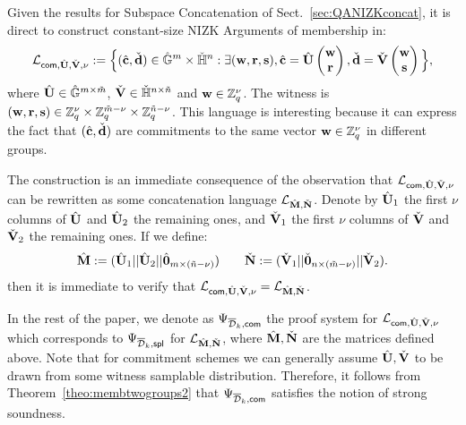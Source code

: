 
Given the results for Subspace Concatenation of 
Sect.~\ref{sec:QANIZKconcat}, it is direct to construct constant-size NIZK Arguments of membership in:
$$\mathcal{L}_{\mathsf{com},{\hat{\mathbf{{U}}}},\check{\mathbf{{V}}},\nu}:=\Big\{({\hat{\mathbf{c}}},\check{\mathbf{d}}) \in {\ensuremath{\hat{\mathbb{G}}}}^{m} \times {\ensuremath{\check{\mathbb{H}}}}^{n}:  \exists (\mathbf{w},\mathbf{r},\mathbf{s}),  
{\hat{\mathbf{c}}}= {\hat{\mathbf{{U}}}} \begin{pmatrix} \mathbf{w}\\ 
 \mathbf{r} \end{pmatrix}, \check{\mathbf{d}}=\check{\mathbf{{V}}} \begin{pmatrix} \mathbf{w} \\ \mathbf{s} \end{pmatrix}\Big\},$$
where ${\hat{\mathbf{{U}}}}\in {\ensuremath{\hat{\mathbb{G}}}}^{m \times \tilde{m}}$, 
$\check{\mathbf{{V}}} \in {\ensuremath{\check{\mathbb{H}}}}^{n \times \tilde{n}}$
and $\mathbf{w} \in \mathbb{Z}_q^{\nu}$. The witness is 
 $(\mathbf{w},\mathbf{r},\mathbf{s}) \in \mathbb{Z}_q^{\nu} \times \mathbb{Z}_q^{\tilde{m}-\nu} \times \mathbb{Z}_q^{\tilde{n}-\nu}$. This language is interesting because it can express the fact that 
$({\hat{\mathbf{c}}},\check{\mathbf{d}})$ are commitments to the same vector 
$\mathbf{w} \in \mathbb{Z}_q^{\nu}$ in different groups.
 
The construction is an immediate consequence of the observation 
that $\mathcal{L}_{\mathsf{com},{\hat{\mathbf{{U}}}},\check{\mathbf{{V}}},\nu}$  can be rewritten as some concatenation language $\mathcal{L}_{{\hat{\mathbf{{M}}}},\check{\mathbf{{N}}}}$.
Denote by ${\hat{\mathbf{{U}}}}_1$ the first $\nu$ columns of ${\hat{\mathbf{{U}}}}$  and ${\hat{\mathbf{{U}}}}_2$ the remaining ones, and $\check{\mathbf{{V}}}_1$ the first $\nu$ columns of $\check{\mathbf{{V}}}$ and $\check{\mathbf{{V}}}_2$ the remaining ones. If we define: 
\begin{equation*}
 {\hat{\mathbf{{M}}}} := ({\hat{\mathbf{{U}}}}_1||{\hat{\mathbf{{U}}}}_2||{\hat{\mathbf{{0}}}}_{m\times (\tilde{n}-\nu)}) \qquad
\check{\mathbf{{N}}} := (\check{\mathbf{{V}}}_1||\check{\mathbf{{0}}}_{n\times (\tilde{m}- \nu)}||\check{\mathbf{{V}}}_2).
\end{equation*}
then it is immediate to verify that $\mathcal{L}_{\mathsf{com},{\hat{\mathbf{{U}}}},\check{\mathbf{{V}}},\nu}=\mathcal{L}_{{\hat{\mathbf{{M}}}},\check{\mathbf{{N}}}}$.

In the rest of the paper, we denote as $\Psi_{\overline{\mathcal{D}}_k,\mathsf{com}}$ the proof 
system for $\mathcal{L}_{\mathsf{com},{\hat{\mathbf{{U}}}},\check{\mathbf{{V}}},\nu}$ which corresponds to $\Psi_{\overline{\mathcal{D}}_k,\mathsf{spl}}$ for $\mathcal{L}_{{\hat{\mathbf{{M}}}},\check{\mathbf{{N}}}}$, where ${\hat{\mathbf{{M}}}},\check{\mathbf{{N}}}$ are the matrices defined above. Note that for commitment schemes we can generally assume ${\hat{\mathbf{{U}}}},\check{\mathbf{{V}}}$ to be drawn from some witness samplable distribution. Therefore, it follows from Theorem~\ref{theo:membtwogroups2} that $\Psi_{\overline{\mathcal{D}}_k,\mathsf{com}}$ satisfies the notion of strong soundness.  

 


